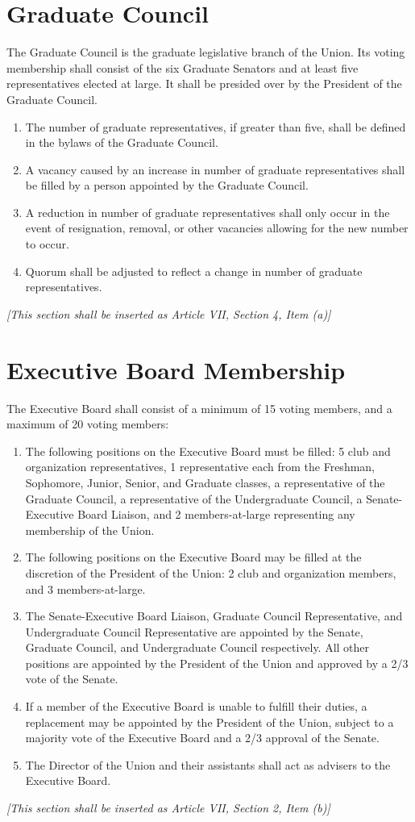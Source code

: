 \documentclass{uniondoc}
\begin{document}
\section{Graduate Council}
The Graduate Council is the graduate legislative branch of the Union. Its voting membership shall consist of the six Graduate Senators and at least five representatives elected at large. It shall be presided over by the President of the Graduate Council.
\begin{enumerate}
\item The number of graduate representatives, if greater than five, shall be defined in the bylaws of the Graduate Council.
\item A vacancy caused by an increase in number of graduate representatives shall be filled by a person appointed by the Graduate Council.
\item A reduction in number of graduate representatives shall only occur in the event of resignation, removal, or other vacancies allowing for the new number to occur.
\item Quorum shall be adjusted to reflect a change in number of graduate representatives.
\end{enumerate}
\textit{[This section shall be inserted as Article VII, Section 4, Item (a)]}

\section{Executive Board Membership}
The Executive Board shall consist of a minimum of 15 voting members, and a maximum of 20 voting members:
\begin{enumerate}
\item The following positions on the Executive Board must be filled: 5 club and organization representatives, 1 representative each from the Freshman, Sophomore, Junior, Senior, and Graduate classes, a representative of the Graduate Council, a representative of the Undergraduate Council, a Senate-Executive Board Liaison, and 2 members-at-large representing any membership of the Union.
\item The following positions on the Executive Board may be filled at the discretion of the President of the Union: 2 club and organization members, and 3 members-at-large.
\item The Senate-Executive Board Liaison, Graduate Council Representative, and Undergraduate Council Representative are appointed by the Senate, Graduate Council, and Undergraduate Council respectively. All other positions are appointed by the President of the Union and approved by a 2/3 vote of the Senate.
\item If a member of the Executive Board is unable to fulfill their duties, a replacement may be appointed by the President of the Union, subject to a majority vote of the Executive Board and a 2/3 approval of the Senate.
\item The Director of the Union and their assistants shall act as advisers to the Executive Board.
\end{enumerate}
\textit{[This section shall be inserted as Article VII, Section 2, Item (b)]}
\end{document}

